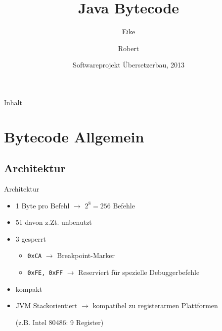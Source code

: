 \documentclass[10pt]{beamer}
\title[Bytecode] %
{Java Bytecode}
\author[Author, Another] %
{Eike \and Robert}
\institute[FU Berlin] %
{Freie Universität Berlin}
\date[Übersetzerbau 2013] %
{Softwareprojekt Übersetzerbau, 2013}
\begin{document}

\begin{frame}[plain]
  \titlepage
\end{frame}


\begin{frame}{Inhalt}
  \tableofcontents
\end{frame}


\section{Bytecode Allgemein}

\subsection{Architektur}
\begin{frame}{Architektur}
\begin{itemize}
\item 1 Byte pro Befehl $\rightarrow$ $2^8=256$ Befehle
\item 51 davon z.Zt. unbenutzt
\item 3 gesperrt
\begin{itemize}
\item {\tt 0xCA} $\rightarrow$ Breakpoint-Marker
\item {\tt 0xFE, 0xFF} $\rightarrow$ Reserviert für spezielle Debuggerbefehle
\end{itemize}
\item kompakt
\end{itemize}

\begin{itemize}
\item JVM Stackorientiert $\rightarrow$ kompatibel zu registerarmen Plattformen

(z.B. Intel 80486: 9 Register)
\end{itemize}
\end{frame}

\end{document}
